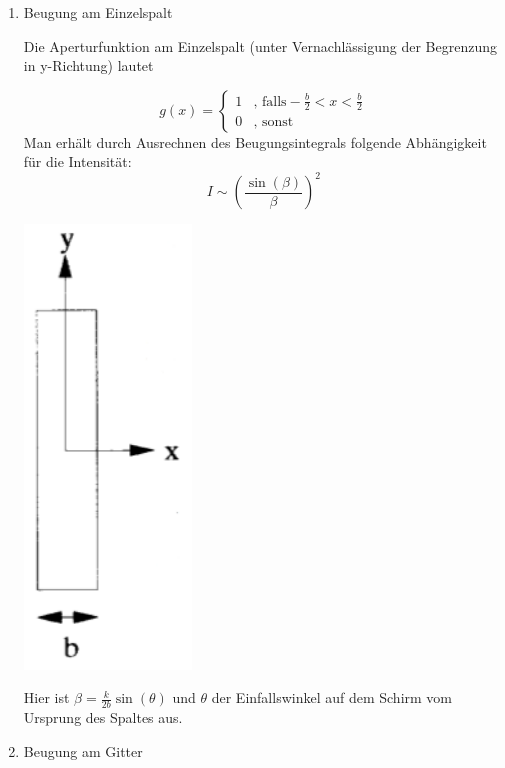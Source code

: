 \begin{enumerate}


\item Beugung am Einzelspalt

Die Aperturfunktion am Einzelspalt (unter Vernachl\"assigung der Begrenzung in y-Richtung) lautet

\begin{minipage}{0.6\textwidth}
$$g(x) = \begin{cases} 
	1 & \text{, falls} -\frac{b}{2}<x<\frac{b}{2}\\
	0 & \text{, sonst}
     \end{cases} $$
Man erh\"alt durch Ausrechnen des Beugungsintegrals folgende Abh\"angigkeit f\"ur die Intensit\"at:
$$ I \sim \left(\frac{\sin(\beta)}{\beta}\right)^2 $$
\end{minipage}
\begin{minipage}{0.4\textwidth}
	\begin{center}
	\includegraphics[width=0.35\textwidth]{Bilder/Einzelspalt.jpg}
	\end{center}
\end{minipage}
Hier ist $\beta = \frac{k}{2b}\sin(\theta)$ und $\theta$ der Einfallswinkel auf dem Schirm vom Ursprung des Spaltes aus.


\item Beugung am Gitter





\end{enumerate}